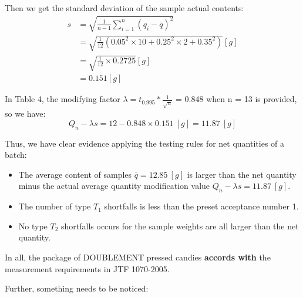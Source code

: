\documentclass[a4paper]{article}
\begin{document}
Then we get the standard deviation of the sample actual contents:
\begin{align*}
s&=\sqrt{\frac{1}{n-1}\displaystyle\sum^n_{i=1}(q_i-\overline{q})^2}
\\&=\sqrt{\frac{1}{12}(0.05^2\times 10+0.25^2\times2+0.35^2)} [g]
\\&=\sqrt{\frac{1}{12}\times0.2725} [g]
\\&=0.151 [g]
\end{align*}

In Table 4, the modifying factor $\lambda = t_0.995*\frac{1}{\sqrt{n}}$ = 0.848 when n = 13 is provided, so we have:
\begin{equation*}
Q_n-\lambda s = 12-0.848\times0.151\ [g]= 11.87\ [g]
\end{equation*}
\par Thus, we have clear evidence applying the testing rules for net quantities of a batch:
\begin{itemize}
\item The average content of samples $ \overline{q}=12.85\ [g] $ is larger than the net quantity minus the actual average quantity modification value $ Q_{n} - \lambda  s = 11.87\ [g]$.\
\item The number of type $T_{1}$ shortfalls is less than the preset acceptance number 1. 
\item No type $T_{2}$ shortfalls occurs for the sample weights are all larger than the net quantity. 
\end{itemize}
\par In all, the package of DOUBLEMENT pressed candies \textbf{accords with} the measurement requirements in JTF 1070-2005. 
\par Further, something needs to be noticed: 
\end{document}
